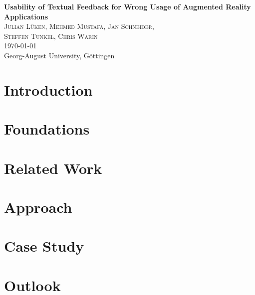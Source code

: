 \documentclass[11pt, a4paper]{article}
\newcommand{\mytitle}{Usability of Textual Feedback for Wrong Usage of Augmented Reality Applications}
\newcommand{\myauthor}{Julian Lüken, Mehmed Mustafa, Jan Schneider,\\ Steffen Tunkel, Chris Warin}
\newcommand{\myuni}{Georg-August University, Göttingen}
\newcommand{\titlespace}{1.5em}
\newenvironment{myabstract}{\begin{abstract}\begin{itshape}}{\end{itshape}\end{abstract}}
\begin{document}
	\begin{acronym}
	\end{acronym}

	\pagestyle{empty}
	\begin{center}
		\begin{minipage}{.8\textwidth}
			\centering
			\huge\textbf{\mytitle}\normalsize\\[\titlespace]
			\textsc{\myauthor}\\[\titlespace]
			\today\\[\titlespace]
			\myuni\\[\titlespace]
		\end{minipage}
	\end{center}
	\vspace{\titlespace}
	\begin{myabstract}
		\lipsum[1-3]
	\end{myabstract}
	\pagestyle{myheadings}
	\pagebreak


	\section*{Introduction}

		\lipsum[1]

	\section*{Foundations}
		\lipsum[2]

	\section*{Related Work}
		\lipsum[3]

	\section*{Approach}
		\lipsum[4]

	\section*{Case Study}
		\lipsum[5]

	\section*{Outlook}
		\lipsum[6] \cite{Trivedi1985}

	\pagebreak
	\printbibliography
\restoregeometry
\end{document}
